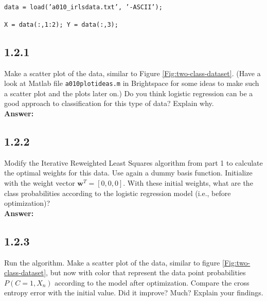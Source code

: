 \documentclass[a4paper]{article}
\begin{document}
\hspace{1cm} \texttt{data = load('a010\_irlsdata.txt', '-ASCII');}

\hspace{1cm} \texttt{X = data(:,1:2); Y = data(:,3);}\\

\subsection*{1.2.1}

Make a scatter plot of the data, similar to Figure \ref{Fig:two-class-dataset}. (Have a look at Matlab file \texttt{a010plotideas.m} in Brightspace for some ideas to make such a scatter plot and the plots later on.) Do you think logistic regression can be a good approach to classification for this type of data? Explain why.\\

\textbf{Answer:}\\






\subsection*{1.2.2}

Modify the Iterative Reweighted Least Squares algorithm from part 1 to calculate the optimal weights for this data. Use again a dummy basis function. Initialize with the weight vector $\textbf{w}^T = [0, 0, 0]$. With these initial weights, what are the class probabilities according to the logistic regression model (i.e., before optimization)?\\

\textbf{Answer:}\\








\subsection*{1.2.3}

Run the algorithm. Make a scatter plot of the data, similar to figure \ref{Fig:two-class-dataset}, but now with color that represent the data point probabilities $P(C = 1, X_n)$ according to the model after optimization. Compare the cross entropy error with the initial value. Did it improve? Much? Explain your findings.\\
\end{document}
